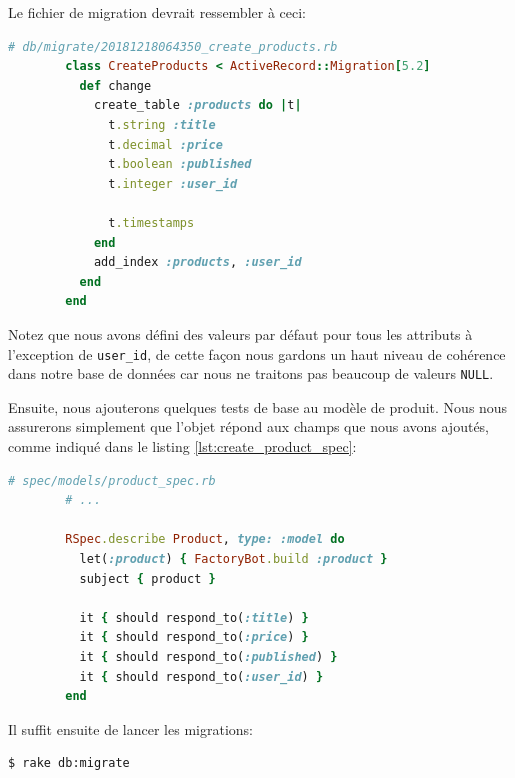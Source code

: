 \documentclass[]{report}
\begin{document}
      Le fichier de migration devrait ressembler à ceci:

      \begin{scriptsize}
        \begin{lstlisting}[language=ruby]
        # db/migrate/20181218064350_create_products.rb
        class CreateProducts < ActiveRecord::Migration[5.2]
          def change
            create_table :products do |t|
              t.string :title
              t.decimal :price
              t.boolean :published
              t.integer :user_id

              t.timestamps
            end
            add_index :products, :user_id
          end
        end
        \end{lstlisting}
      \end{scriptsize}

      Notez que nous avons défini des valeurs par défaut pour tous les attributs à l'exception de \verb|user_id|, de cette façon nous gardons un haut niveau de cohérence dans notre base de données car nous ne traitons pas beaucoup de valeurs \verb|NULL|.

      Ensuite, nous ajouterons quelques tests de base au modèle de produit. Nous nous assurerons simplement que l'objet répond aux champs que nous avons ajoutés, comme indiqué dans le listing \ref{lst:create_product_spec}:

      \begin{scriptsize}
        \begin{lstlisting}[language=ruby, caption={Le premier test de notre modèle de produit}, label={lst:create_product_spec}]
        # spec/models/product_spec.rb
        # ...

        RSpec.describe Product, type: :model do
          let(:product) { FactoryBot.build :product }
          subject { product }

          it { should respond_to(:title) }
          it { should respond_to(:price) }
          it { should respond_to(:published) }
          it { should respond_to(:user_id) }
        end
        \end{lstlisting}
      \end{scriptsize}

      Il suffit ensuite de lancer les migrations:

      \begin{scriptsize}
        \begin{lstlisting}[language=bash]
        $ rake db:migrate
        \end{lstlisting}
      \end{scriptsize}
\end{document}
